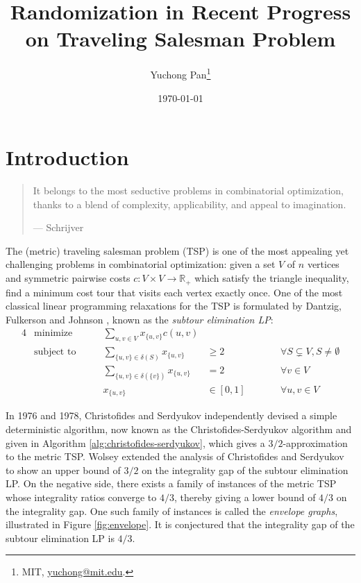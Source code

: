 \documentclass[letterpaper, reqno,12pt]{article}
\newcommand{\RR}{\mathbb{R}}
\begin{document}
\title{\Large Randomization in Recent Progress on Traveling Salesman Problem}
\author{Yuchong Pan\thanks{MIT, \href{mailto:yuchong@mit.edu}{yuchong@mit.edu}.}}
\date{\today}
\newtheorem{theorem}{Theorem}[section]
\newtheorem{lemma}[theorem]{Lemma}
\newtheorem{corollary}[theorem]{Corollary}
\newtheorem{proposition}[theorem]{Proposition}
\newtheorem{fact}[theorem]{Fact}
\theoremstyle{definition} \newtheorem{definition}[theorem]{Definition}
\maketitle
%

\section{Introduction}

\begin{quote}
  It belongs to the most seductive problems in combinatorial optimization, thanks to a blend of complexity, applicability, and appeal to imagination.

  --- Schrijver \cite{schrijver2003combinatorial}
\end{quote}

The (metric) traveling salesman problem (TSP) is one of the most appealing yet challenging problems in combinatorial optimization: given a set $V$ of $n$ vertices and symmetric pairwise costs $c : V \times V \to \RR_+$ which satisfy the triangle inequality, find a minimum cost tour that visits each vertex exactly once. One of the most classical linear programming relaxations for the TSP is formulated by Dantzig, Fulkerson and Johnson \cite{dantzig1954solution}, known as the \emph{subtour elimination LP}:
\begin{alignat*}{4}
  & \text{minimize} \qquad & \sum_{u, v \in V} x_{\{ u, v \}} c(u, v) \\
  & \text{subject to} \qquad & \sum_{\{ u, v \} \in \delta(S)} x_{\{ u, v \}} &\geq 2 && \qquad \forall S \subsetneq V, S \neq \emptyset \\
  & & \sum_{\{ u, v \} \in \delta(\{ v \})} x_{\{ u, v \}} &= 2 && \qquad \forall v \in V \\
  & & x_{\{ u, v \}} &\in [0, 1] && \qquad \forall u, v \in V
\end{alignat*}

In 1976 and 1978, Christofides \cite{christofides1976worst} and Serdyukov \cite{serdyukov1978nekotorykh} independently devised a simple deterministic algorithm, now known as the Christofides-Serdyukov algorithm and given in Algorithm \ref{alg:christofides-serdyukov}, which gives a $3/2$-approximation to the metric TSP. Wolsey \cite{wolsey1980heuristic} extended the analysis of Christofides and Serdyukov to show an upper bound of $3/2$ on the integrality gap of the subtour elimination LP. On the negative side, there exists a family of instances of the metric TSP whose integrality ratios converge to $4/3$, thereby giving a lower bound of $4/3$ on the integrality gap. One such family of instances is called the \emph{envelope graphs}, illustrated in Figure \ref{fig:envelope}. It is conjectured that the integrality gap of the subtour elimination LP is $4/3$.
\end{document}
